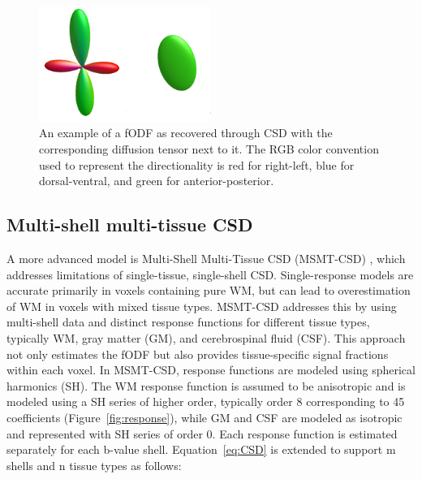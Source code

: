 \begin{figure}[h]
  \centering
  \includegraphics[width=0.5\textwidth]{Images/odf.png} %
  \caption{An example of a fODF as recovered through CSD with the corresponding diffusion tensor next to it. The RGB color convention used to represent the directionality is red for right-left, blue for dorsal-ventral, and green for anterior-posterior.}
  \label{fig:odf}
\end{figure}

\subsection{Multi-shell multi-tissue CSD}
A more advanced model is Multi-Shell Multi-Tissue CSD (MSMT-CSD) \cite{Jeurissen2014}, which addresses limitations of single-tissue, single-shell CSD. Single-response models are accurate primarily in voxels containing pure WM, but can lead to overestimation of WM in voxels with mixed tissue types. MSMT-CSD addresses this by using multi-shell data and distinct response functions for different tissue types, typically WM, gray matter (GM), and cerebrospinal fluid (CSF). This approach not only estimates the fODF but also provides tissue-specific signal fractions within each voxel.
In MSMT-CSD, response functions are modeled using spherical harmonics (SH). The WM response function is assumed to be anisotropic and is modeled using a SH series of higher order, typically order 8 corresponding to 45 coefficients (Figure~\ref{fig:response}), while GM and CSF are modeled as isotropic and represented with SH series of order 0. Each response function is estimated separately for each b-value shell. 
Equation~\ref{eq:CSD} is extended to support m shells and n tissue types as follows:


